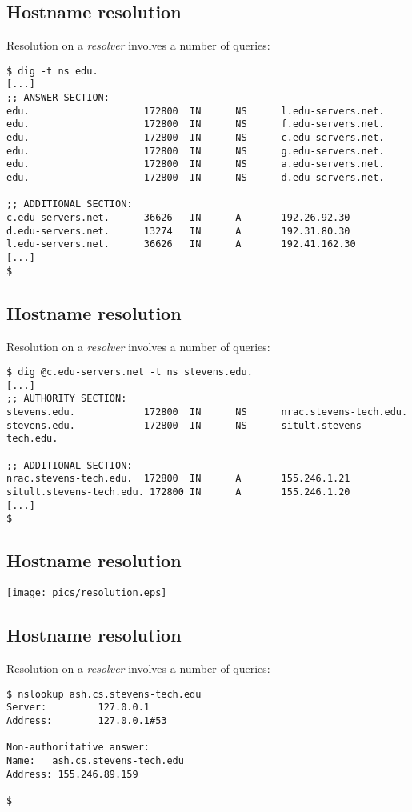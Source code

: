 \documentclass[xga]{xdvislides}
\begin{document}
\subsection{Hostname resolution}
Resolution on a {\em resolver} involves a number of queries:
\begin{verbatim}
$ dig -t ns edu.
[...]
;; ANSWER SECTION:
edu.                    172800  IN      NS      l.edu-servers.net.
edu.                    172800  IN      NS      f.edu-servers.net.
edu.                    172800  IN      NS      c.edu-servers.net.
edu.                    172800  IN      NS      g.edu-servers.net.
edu.                    172800  IN      NS      a.edu-servers.net.
edu.                    172800  IN      NS      d.edu-servers.net.

;; ADDITIONAL SECTION:
c.edu-servers.net.      36626   IN      A       192.26.92.30
d.edu-servers.net.      13274   IN      A       192.31.80.30
l.edu-servers.net.      36626   IN      A       192.41.162.30
[...]
$
\end{verbatim}
\Normalsize

\subsection{Hostname resolution}
Resolution on a {\em resolver} involves a number of queries:
\begin{verbatim}
$ dig @c.edu-servers.net -t ns stevens.edu.
[...]
;; AUTHORITY SECTION:
stevens.edu.            172800  IN      NS      nrac.stevens-tech.edu.
stevens.edu.            172800  IN      NS      sitult.stevens-tech.edu.

;; ADDITIONAL SECTION:
nrac.stevens-tech.edu.  172800  IN      A       155.246.1.21
sitult.stevens-tech.edu. 172800 IN      A       155.246.1.20
[...]
$
\end{verbatim}

\subsection{Hostname resolution}
\vspace*{\fill}
\begin{center}
	\texttt{[image: pics/resolution.eps]}
\end{center}
\vspace*{\fill}


\subsection{Hostname resolution}
Resolution on a {\em resolver} involves a number of queries:
\begin{verbatim}
$ nslookup ash.cs.stevens-tech.edu
Server:         127.0.0.1
Address:        127.0.0.1#53

Non-authoritative answer:
Name:   ash.cs.stevens-tech.edu
Address: 155.246.89.159

$
\end{verbatim}
\end{document}
